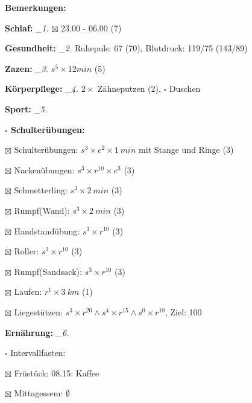 \documentclass[10pt,a4paper]{article}
\newcommand\prop[1] {{\color {alizarin} {\bf #1}}}        %
\newcommand\mand[1] {{\color {burntorange} {\bf #1}}}     %
\newcommand\topspace{\vskip -15pt \hskip 20pt}
\newcommand\bottomspace{\vskip 4pt}
\newcommand\n[1] { {\sl #1.} \hskip 5pt }
\begin{document}
\begin{mdframed}[style=daystyle]
  \begin{labeling}{{\mand {Bemerkungen:}}}
    \setlength\itemsep{-3pt}
  \item[{\mand {Schlaf:}}]        \n{\_1} $\boxtimes$ 23.00 - 06.00 (7)
  \item[{\mand {Gesundheit:}}]    \n{\_2} Ruhepuls: 67 (70), Blutdruck: 119/75 (143/89)
  \item[{\mand {Zazen:}}]         \n{\_3} $s^5 \times 12 min$ (5)
  \item[{\mand {Körperpflege:}}]  \n{\_4} $2 \times$ Zähneputzen (2), $\square$ Duschen
  \item[{\mand {Sport:}}]         \n{\_5}
    \topspace
    \begin{minipage}{0.75\textwidth}  
      \begin{labeling}{\prop {$\square$ {Schulterübungen:}}} 
        \setlength\itemsep{-3pt}
      \item[$\boxtimes$ Schulterübungen:] $s^3 \times e^2 \times 1\ min$ mit Stange und Ringe (3)
      \item[$\boxtimes$ Nackenübungen:]   $s^3 \times r^{10} \times e^3$ (3)
      \item[$\boxtimes$ Schmetterling:]   $s^3 \times 2\ min$ (3)
      \item[$\boxtimes$ Rumpf(Wand):]     $s^3 \times 2\ min$ (3)
      \item[$\boxtimes$ Handstandübung:]  $s^3 \times r^{10}$ (3)
      \item[$\boxtimes$ Roller:]          $s^3 \times r^{10}$ (3)
      \item[$\boxtimes$ Rumpf(Sandsack):] $s^3 \times r^{10}$ (3)
      \item[$\boxtimes$ Laufen:]          $r^1 \times 3\ km$ (1)
      \item[$\boxtimes$ Liegestützen:]    $s^3 \times r^{20} \land s^4 \times r^{15} \land s^0 \times r^{10}$, Ziel: 100
      \end{labeling}
    \end{minipage}
    \bottomspace        
  \item[{\mand {Ernährung:}}]     \n{\_6}
    \topspace
    \begin{minipage}{0.75\textwidth}  
      \begin{labeling}{$\square$ Intervallfasten:} 
        \setlength\itemsep{-3pt}  
      \item[$\boxtimes$ Früstück:]         08.15: Kaffee
      \item[$\boxtimes$ Mittagessem:]      $\emptyset$

\end{labeling}
\end{minipage}
\end{labeling}
\end{mdframed}
\end{document}
